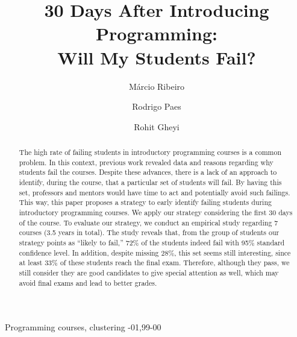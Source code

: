 \documentclass[review]{elsarticle}
\begin{document}
\begin{frontmatter}

\title{30 Days After Introducing Programming:\\Will My Students Fail?}



\author[ufal]{M\'{a}rcio Ribeiro}

\author[ufal]{Rodrigo Paes}

\author[ufcg]{Rohit Gheyi}

\address[ufal]{Federal University of Alagoas, Macei\'{o}, Brazil}
\address[ufcg]{Federal University of Campina Grande, Campina Grande, Brazil}

\begin{abstract}
The high rate of failing students in introductory programming courses is a common problem. In this context, previous work revealed data and reasons regarding why students fail the courses. Despite these advances, there is a lack of an approach to identify, during the course, that a particular set of students will fail. By having this set, professors and mentors would have time to act and potentially avoid such failings. This way, this paper proposes a strategy to early identify failing students during introductory programming courses. We apply our strategy considering the first 30 days of the course. To evaluate our strategy, we conduct an empirical study regarding 7 courses (3.5 years in total). The study reveals that, from the group of students our strategy points as ``likely to fail,'' 72\% of the students indeed fail with 95\% standard confidence level. In addition, despite missing 28\%, this set seems still interesting, since at least 33\% of these students reach the final exam. Therefore, although they pass, we still consider they are good candidates to give special attention as well, which may avoid final exams and lead to better grades.


\end{abstract}

\begin{keyword}
Programming courses, clustering
-01\sep  99-00
\end{keyword}

\end{frontmatter}
\end{document}
